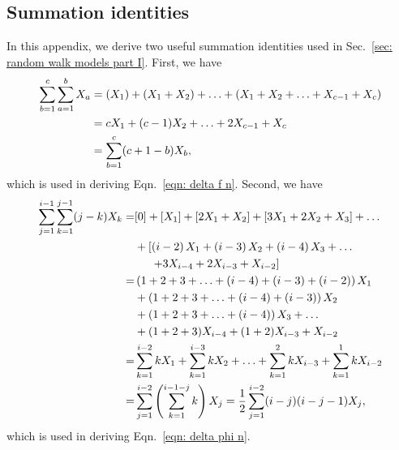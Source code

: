 \documentclass[../full_thesis/full_thesis.tex]{subfiles}
\begin{document}
\begin{subappendices}

\section{Summation identities}
\label{sec: summation identities}
In this appendix, we derive two useful summation identities used in
Sec.~\ref{sec: random walk models part I}. First, we have
\begin{align}
\sum_{b=1}^{c}\sum_{a=1}^{b} X_{a} & = \left( X_{1}\right)
 + \left( X_{1} + X_{2} \right) + \ldots  +\left( X_{1} + X_{2}
 + \ldots + X_{c-1} + X_{c}\right)\\
& = c X_{1} + (c-1)X_{2} + \ldots + 2 X_{c-1} + X_{c} \\
& = \sum_{b=1}^{c}(c+1-b)X_{b},
\label{eqn: SI 1}
\end{align}
which is used in deriving Eqn.~\eqref{eqn: delta f n}. Second, we have
\begin{align}
\sum_{j=1}^{i-1}\sum_{k=1}^{j-1}(j-k)X_{k} = & [0] + \left[ X_{1}\right]
+ \left[2X_{1} + X_{2} \right] + \left[3X_{1} + 2X_{2} +X_{3}\right]
+ \ldots  \nonumber \\
& + \left[\left(i-2\right)X_{1} + \left(i-3\right)X_{2}
+ \left(i-4\right)X_{3} + \ldots \right. \nonumber \\
& \left. \hspace{5mm}+ 3X_{i-4} + 2X_{i-3} + X_{i-2}\right]  \\
= & \left(1 + 2 + 3 + \ldots +  (i-4) + (i-3) + (i-2)\right)X_{1} \nonumber  \\
& + \left(1 + 2 + 3 + \ldots +(i-4) + (i-3) \right)X_{2}  \nonumber \\
& + \left(1 + 2 + 3 + \ldots + (i-4) \right)X_{3} + \ldots  \nonumber \\
& + (1 + 2 + 3)X_{i-4} + (1+2)X_{i-3} + X_{i-2}  \\
= & \sum_{k=1}^{i-2}k X_{1} + \sum_{k=1}^{i-3}k X_{2}  + \ldots + \sum_{k=1}^{2}k X_{i-3}
+ \sum_{k=1}^{1}kX_{i-2}  \\
= & \sum_{j=1}^{i-2}\left(\sum_{k=1}^{i-1-j}k\right)X_{j} =
\frac{1}{2}\sum_{j=1}^{i-2}(i-j)(i-j-1)X_{j},
\label{eqn: SI 2}
\end{align}
which is used in deriving Eqn.~\eqref{eqn: delta phi n}.



\end{subappendices}
\end{document}
